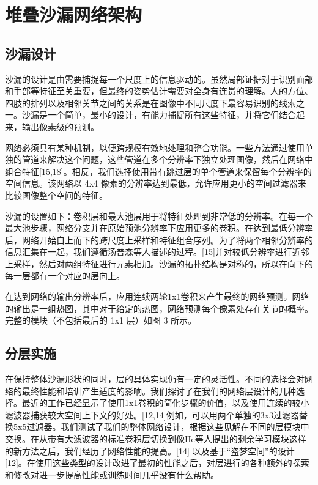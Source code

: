 
\thesistranslationchinese
\section{堆叠沙漏网络架构}

\subsection{沙漏设计}

沙漏的设计是由需要捕捉每一个尺度上的信息驱动的。虽然局部证据对于识别面部和手部等特征至关重要，但最终的姿势估计需要对全身有连贯的理解。人的方位、四肢的排列以及相邻关节之间的关系是在图像中不同尺度下最容易识别的线索之一。沙漏是一个简单，最小的设计，有能力捕捉所有这些特征，并将它们结合起来，输出像素级的预测。 

网络必须具有某种机制，以便跨规模有效地处理和整合功能。一些方法通过使用单独的管道来解决这个问题，这些管道在多个分辨率下独立处理图像，然后在网络中组合特征[15,18]。相反，我们选择使用带有跳过层的单个管道来保留每个分辨率的空间信息。该网络以 4x4 像素的分辨率达到最低，允许应用更小的空间过滤器来比较图像整个空间的特征。 

沙漏的设置如下：卷积层和最大池层用于将特征处理到非常低的分辨率。在每一个最大池步骤，网络分支并在原始预池分辨率下应用更多的卷积。在达到最低分辨率后，网络开始自上而下的跨尺度上采样和特征组合序列。为了将两个相邻分辨率的信息汇集在一起，我们遵循汤普森等人描述的过程。[15]并对较低分辨率进行近邻上采样，然后对两组特征进行元素相加。沙漏的拓扑结构是对称的，所以在向下的每一层都有一个对应的层向上。 

在达到网络的输出分辨率后，应用连续两轮1x1卷积来产生最终的网络预测。网络的输出是一组热图，其中对于给定的热图，网络预测每个像素处存在关节的概率。完整的模块（不包括最后的 1x1 层）如图 3 所示。

\subsection{分层实施}

在保持整体沙漏形状的同时，层的具体实现仍有一定的灵活性。不同的选择会对网络的最终性能和培训产生适度的影响。我们探讨了在我们的网络层设计的几种选择。最近的工作已经显示了使用1x1卷积的简化步骤的价值，以及使用连续的较小滤波器捕获较大空间上下文的好处。[12,14]例如，可以用两个单独的3x3过滤器替换5x5过滤器。我们测试了我们的整体网络设计，根据这些见解在不同的层模块中交换。在从带有大滤波器的标准卷积层切换到像He等人提出的剩余学习模块这样的新方法之后，我们经历了网络性能的提高。[14] 以及基于“盗梦空间”的设计[12]。在使用这些类型的设计改进了最初的性能之后，对层进行的各种额外的探索和修改对进一步提高性能或训练时间几乎没有什么帮助。 

